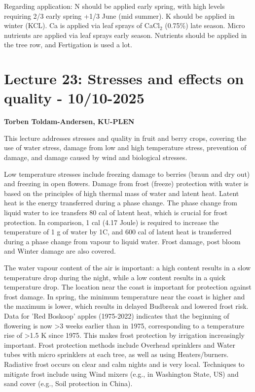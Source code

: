 \vspace{0.5em}
Regarding application: N should be applied early spring, with high levels requiring 2/3 early spring +1/3 June (mid summer). K should be applied in winter (KCL). Ca is applied via leaf sprays of CaCl$_2$ (0.75\%) late season. Micro nutrients are applied via leaf sprays early season. Nutrients should be applied in the tree row, and Fertigation is used a lot.

\section{Lecture 23: Stresses and effects on quality - 10/10-2025}
\textbf{Torben Toldam-Andersen, KU-PLEN}

\vspace{1em}
This lecture addresses stresses and quality in fruit and berry crops, covering the use of water stress, damage from low and high temperature stress, prevention of damage, and damage caused by wind and biological stresses.

\vspace{0.5em}
Low temperature stresses include freezing damage to berries (braun and dry out) and freezing in open flowers. Damage from frost (freeze) protection with water is based on the principles of high thermal mass of water and latent heat. Latent heat is the energy transferred during a phase change. The phase change from liquid water to ice transfers 80 cal of latent heat, which is crucial for frost protection. In comparison, 1 cal (4.17 Joule) is required to increase the temperature of 1 g of water by 1\textdegree C, and 600 cal of latent heat is transferred during a phase change from vapour to liquid water. Frost damage, post bloom and Winter damage are also covered.

\vspace{0.5em}
The water vapour content of the air is important: a high content results in a slow temperature drop during the night, while a low content results in a quick temperature drop. The location near the coast is important for protection against frost damage. In spring, the minimum temperature near the coast is higher and the maximum is lower, which results in delayed Budbreak and lowered frost risk. Data for 'Red Boskoop' apples (1975-2022) indicates that the beginning of flowering is now >3 weeks earlier than in 1975, corresponding to a temperature rise of >1.5 K since 1975. This makes frost protection by irrigation increasingly important. Frost protection methods include Overhead sprinklers and Water tubes with micro sprinklers at each tree, as well as using Heaters/burners. Radiative frost occurs on clear and calm nights and is very local. Techniques to mitigate frost include using Wind mixers (e.g., in Washington State, US) and sand cover (e.g., Soil protection in China).

